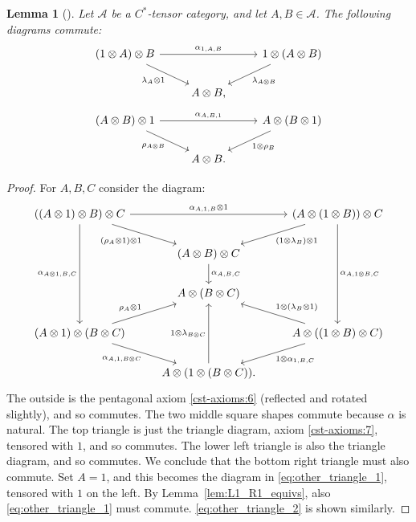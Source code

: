 \documentclass[a4paper,11pt]{article}
\theoremstyle{plain}
\newtheorem{lemma}[proposition]{Lemma}
\theoremstyle{remark}
\newcommand{\mc}[1]{\mathcal{#1}}
\begin{document}
\begin{lemma}[{\cite[Proposition~2.2.4]{EGNO_TensorCategories}}]\label{lem:other_triangles}
Let $\mc A$ be a $C^*$-tensor category, and let $A,B\in\mc A$.  The following diagrams commute:
\begin{equation}
\begin{tikzcd}
  (1\otimes A)\otimes B \ar[rr, "\alpha_{1,A,B}"] \ar[rd, "\lambda_A\otimes 1"'] && 1\otimes (A\otimes B) \ar[ld, "\lambda_{A\otimes B}"] \\
  & A\otimes B,
\end{tikzcd} \label{eq:other_triangle_1}
\end{equation}
\begin{equation}
\begin{tikzcd}
  (A\otimes B)\otimes 1 \ar[rd, "\rho_{A\otimes B}"'] \ar[rr, "\alpha_{A,B,1}"] && A\otimes(B\otimes 1) \ar[ld, "1\otimes\rho_B"] \\
  & A\otimes B.
\end{tikzcd} \label{eq:other_triangle_2}
\end{equation}
\end{lemma}
\begin{proof}
For $A,B,C$ consider the diagram:
\[ \begin{tikzcd}
((A\otimes 1)\otimes B) \otimes C \ar[rr, "\alpha_{A,1,B}\otimes 1"] \ar[rd, "(\rho_A\otimes 1)\otimes 1"'] \ar[ddd, "\alpha_{A\otimes 1,B,C}"'] &&
   (A\otimes(1\otimes B))\otimes C \ar[ld, "(1\otimes\lambda_B)\otimes 1"] \ar[ddd, "\alpha_{A,1\otimes B,C}"] \\
   & (A\otimes B)\otimes C \ar[d, "\alpha_{A,B,C}"] \\
   & A\otimes(B\otimes C) \\
(A\otimes 1)\otimes(B\otimes C)  \ar[rd, "\alpha_{A,1,B\otimes C}"'] \ar[ru, "\rho_A\otimes 1"] &&
   A\otimes((1\otimes B)\otimes C) \ar[ld, "1\otimes\alpha_{1,B,C}"] \ar[lu, "1\otimes(\lambda_B\otimes 1)"'] \\
   & A\otimes (1\otimes (B\otimes C)). \ar[uu, "1\otimes\lambda_{B\otimes C}"]
\end{tikzcd} \]
The outside is the pentagonal axiom \ref{cst-axioms:6} (reflected and rotated slightly), and so commutes.  The two middle square shapes commute because $\alpha$ is natural.  The top triangle is just the triangle diagram, axiom \ref{cst-axioms:7}, tensored with $1$, and so commutes.  The lower left triangle is also the triangle diagram, and so commutes.  We conclude that the bottom right triangle must also commute.  Set $A=1$, and this becomes the diagram in \eqref{eq:other_triangle_1}, tensored with $1$ on the left.  By Lemma~\ref{lem:L1_R1_equivs}, also \eqref{eq:other_triangle_1} must commute.  \eqref{eq:other_triangle_2} is shown similarly.
\end{proof}
\end{document}
